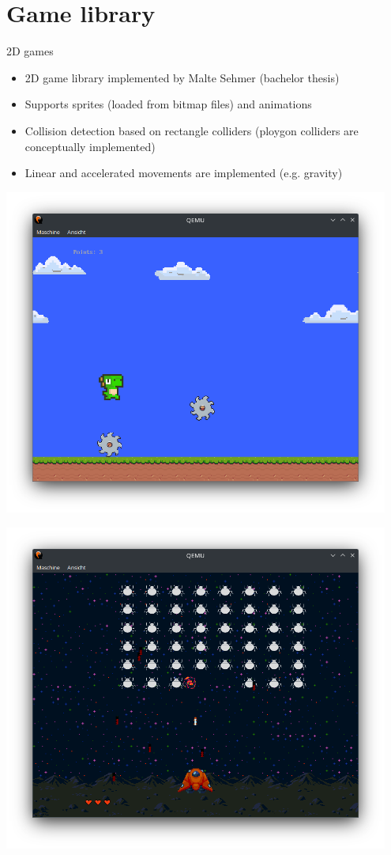 \section{Game library}

\begin{frame}{2D games}
	\begin{itemize}
		\setlength\itemsep{1em}
		\item 2D game library implemented by Malte Sehmer (bachelor thesis)
		\item Supports sprites (loaded from bitmap files) and animations
		\item Collision detection based on rectangle colliders (ploygon colliders are conceptually implemented)
		\item Linear and accelerated movements are implemented (e.g. gravity)
	\end{itemize}
	\begin{minipage}{0.49\textwidth}
		\includegraphics[width=0.95\textwidth]{img/dino}
	\end{minipage}
	\begin{minipage}{0.49\textwidth}
	\includegraphics[width=0.95\textwidth]{img/bug}
	\end{minipage}
\end{frame}

